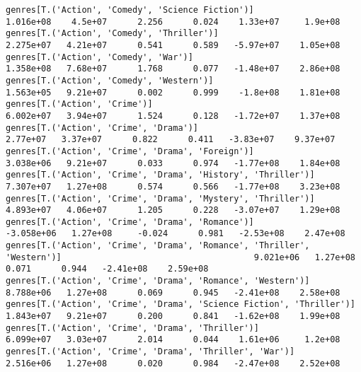 \documentclass[11pt]{article}
\begin{document}
\begin{Verbatim}[commandchars=\\\{\}]
genres[T.('Action', 'Comedy', 'Science Fiction')]                                                             1.016e+08    4.5e+07      2.256      0.024    1.33e+07     1.9e+08
genres[T.('Action', 'Comedy', 'Thriller')]                                                                    2.275e+07   4.21e+07      0.541      0.589   -5.97e+07    1.05e+08
genres[T.('Action', 'Comedy', 'War')]                                                                         1.358e+08   7.68e+07      1.768      0.077   -1.48e+07    2.86e+08
genres[T.('Action', 'Comedy', 'Western')]                                                                     1.563e+05   9.21e+07      0.002      0.999    -1.8e+08    1.81e+08
genres[T.('Action', 'Crime')]                                                                                 6.002e+07   3.94e+07      1.524      0.128   -1.72e+07    1.37e+08
genres[T.('Action', 'Crime', 'Drama')]                                                                         2.77e+07   3.37e+07      0.822      0.411   -3.83e+07    9.37e+07
genres[T.('Action', 'Crime', 'Drama', 'Foreign')]                                                             3.038e+06   9.21e+07      0.033      0.974   -1.77e+08    1.84e+08
genres[T.('Action', 'Crime', 'Drama', 'History', 'Thriller')]                                                 7.307e+07   1.27e+08      0.574      0.566   -1.77e+08    3.23e+08
genres[T.('Action', 'Crime', 'Drama', 'Mystery', 'Thriller')]                                                 4.893e+07   4.06e+07      1.205      0.228   -3.07e+07    1.29e+08
genres[T.('Action', 'Crime', 'Drama', 'Romance')]                                                            -3.058e+06   1.27e+08     -0.024      0.981   -2.53e+08    2.47e+08
genres[T.('Action', 'Crime', 'Drama', 'Romance', 'Thriller', 'Western')]                                      9.021e+06   1.27e+08      0.071      0.944   -2.41e+08    2.59e+08
genres[T.('Action', 'Crime', 'Drama', 'Romance', 'Western')]                                                  8.788e+06   1.27e+08      0.069      0.945   -2.41e+08    2.58e+08
genres[T.('Action', 'Crime', 'Drama', 'Science Fiction', 'Thriller')]                                         1.843e+07   9.21e+07      0.200      0.841   -1.62e+08    1.99e+08
genres[T.('Action', 'Crime', 'Drama', 'Thriller')]                                                            6.099e+07   3.03e+07      2.014      0.044    1.61e+06     1.2e+08
genres[T.('Action', 'Crime', 'Drama', 'Thriller', 'War')]                                                     2.516e+06   1.27e+08      0.020      0.984   -2.47e+08    2.52e+08

\end{Verbatim}
\end{document}
